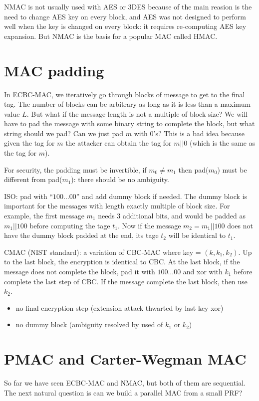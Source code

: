 \documentclass{article}
\begin{document}
NMAC is not usually used with AES or 3DES because of the main reasion is the
need to change AES key on every block, and AES was not designed to perform well
when the key is changed on every block: it requires re-computing AES key
expansion. But NMAC is the basis for a popular MAC called HMAC.

\section{MAC padding}
In ECBC-MAC, we iteratively go through blocks of message to get to the final
tag. The number of blocks can be arbitrary as long as it is less than a maximum
value $L$. But what if the message length is not a multiple of block size? We
will have to pad the message with some binary string to complete the block, but
what string should we pad? Can we just pad $m$ with 0's? This is a bad idea
because given the tag for $m$ the attacker can obtain the tag for $m||0$ (which
is the same as the tag for $m$).

For security, the padding must be invertible, if $m_0 \neq m_1$ then pad($m_0$)
must be different from pad($m_1$): there should be no ambiguity.

ISO: pad with ``$100 \ldots 00$'' and add dummy block if needed. The dummy block
is important for the messages with length exactly multiple of block
size. For example, the first message $m_1$ needs 3 additional bits, and would be
padded as $m_1||100$ before computing the tage $t_1$. Now if the message $m_2 =
m_1||100$ does not have the dummy block padded at the end, its tage $t_2$ will
be identical to $t_1$.

CMAC (NIST standard): a variation of CBC-MAC where key = $(k, k_1, k_2)$. Up to
the last block, the encryption is identical to CBC. At the last block, if the
message does not complete the block, pad it with $100 \ldots 00$ and xor with
$k_1$ before complete the last step of CBC. If the message complete the last
block, then use $k_2$.
\begin{itemize}
\item no final encryption step (extension attack thwarted by last key xor)
\item no dummy block (ambiguity resolved by used of $k_1$ or $k_2$)
\end{itemize}

\section{PMAC and Carter-Wegman MAC}
So far we have seen ECBC-MAC and NMAC, but both of them are sequential. The next
natural question is can we build a parallel MAC from a small PRF?
\end{document}
